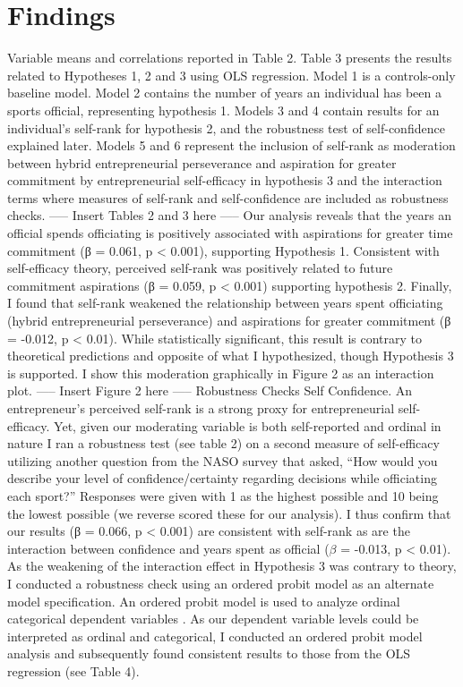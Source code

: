\documentclass{article}
\begin{document}
\section{Findings}
Variable means and correlations reported in Table 2. Table 3 presents the results related to Hypotheses 1, 2 and 3 using OLS regression. Model 1 is a controls-only baseline model.  Model 2 contains the number of years an individual has been a sports official, representing hypothesis 1.  Models 3 and 4 contain results for an individual’s self-rank for hypothesis 2, and the robustness test of self-confidence explained later.  Models 5 and 6 represent the inclusion of self-rank as moderation between hybrid entrepreneurial perseverance and aspiration for greater commitment by entrepreneurial self-efficacy in hypothesis 3 and the interaction terms where measures of self-rank and self-confidence are included as robustness checks.  
-----
Insert Tables 2 and 3 here
-----
 Our analysis reveals that the years an official spends officiating is positively associated with aspirations for greater time commitment (β = 0.061, p < 0.001), supporting Hypothesis 1. Consistent with self-efficacy theory, perceived self-rank was positively related to future commitment aspirations (β = 0.059, p < 0.001) supporting hypothesis 2. Finally, I found that self-rank weakened the relationship between years spent officiating (hybrid entrepreneurial perseverance) and aspirations for greater commitment (β = -0.012, p < 0.01).  While statistically significant, this result is contrary to theoretical predictions and opposite of what I hypothesized, though Hypothesis 3 is supported. I show this moderation graphically in Figure 2 as an interaction plot.
-----
Insert Figure 2 here
-----
Robustness Checks
	Self Confidence. An entrepreneur’s perceived self-rank is a strong proxy for entrepreneurial self-efficacy.  Yet, given our moderating variable is both self-reported and ordinal in nature I ran a robustness test (see table 2) on a second measure of self-efficacy utilizing another question from the NASO survey that asked, “How would you describe your level of confidence/certainty regarding decisions while officiating each sport?” Responses were given with 1 as the highest possible and 10 being the lowest possible (we reverse scored these for our analysis).  I thus confirm that our results (β = 0.066, p < 0.001) are consistent with self-rank as are the interaction between confidence and years spent as official ($\beta$ = -0.013, p < 0.01). 
As the weakening of the interaction effect in Hypothesis 3 was contrary to theory, I conducted a robustness check using an ordered probit model as an alternate model specification.  An ordered probit model is used to analyze ordinal categorical dependent variables \cite{agresti2012categorical}.  As our dependent variable levels could be interpreted as ordinal and categorical, I conducted an ordered probit model analysis and subsequently found consistent results to those from the OLS regression (see Table 4).
\end{document}
